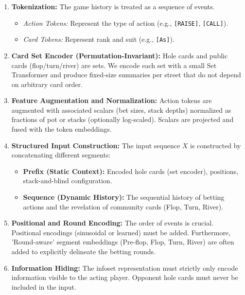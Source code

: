 \documentclass[11pt,a4paper]{article}
\begin{document}
\begin{enumerate}
    \item \textbf{Tokenization:} The game history is treated as a sequence of events.
    \begin{itemize}
        \item \textit{Action Tokens:} Represent the type of action (e.g., \texttt{[RAISE]}, \texttt{[CALL]}).
        \item \textit{Card Tokens:} Represent rank and suit (e.g., \texttt{[As]}).
    \end{itemize}

    \item \textbf{Card Set Encoder (Permutation-Invariant):} Hole cards and public cards (flop/turn/river) are sets. We encode each set with a small Set Transformer \cite{lee2019settransformer} and produce fixed-size summaries per street that do not depend on arbitrary card order.

    \item \textbf{Feature Augmentation and Normalization:} Action tokens are augmented with associated scalars (bet sizes, stack depths) normalized as fractions of pot or stacks (optionally log-scaled). Scalars are projected and fused with the token embeddings.

    \item \textbf{Structured Input Construction:} The input sequence $X$ is constructed by concatenating different segments:
    \begin{itemize}
        \item \textbf{Prefix (Static Context):} Encoded hole cards (set encoder), positions, stack-and-blind configuration.
        \item \textbf{Sequence (Dynamic History):} The sequential history of betting actions and the revelation of community cards (Flop, Turn, River).
    \end{itemize}

    \item \textbf{Positional and Round Encoding:} The order of events is crucial. Positional encodings (sinusoidal or learned) must be added. Furthermore, 'Round-aware' segment embeddings (Pre-flop, Flop, Turn, River) are often added to explicitly delineate the betting rounds.

    \item \textbf{Information Hiding:} The infoset representation must strictly only encode information visible to the acting player. Opponent hole cards must never be included in the input.

\end{enumerate}
\end{document}
